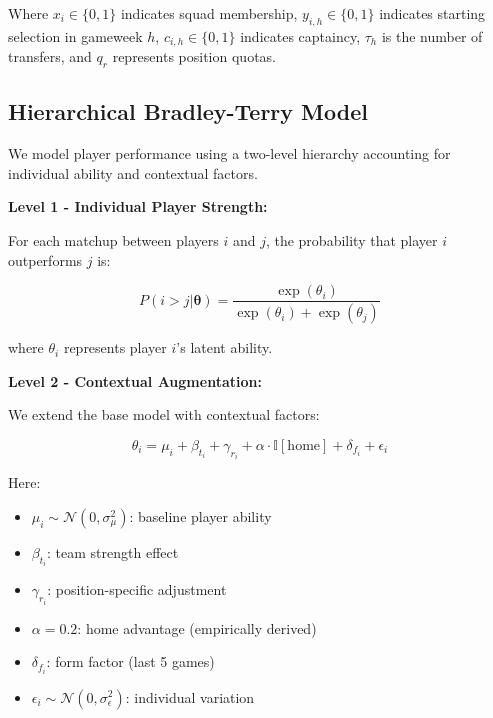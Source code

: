 \documentclass[10pt,a4paper,twocolumn]{article}
\begin{document}
Where $x_i \in \{0,1\}$ indicates squad membership, $y_{i,h} \in \{0,1\}$ indicates starting selection in gameweek $h$, $c_{i,h} \in \{0,1\}$ indicates captaincy, $\tau_h$ is the number of transfers, and $q_r$ represents position quotas.

\subsection*{Hierarchical Bradley-Terry Model}

We model player performance using a two-level hierarchy accounting for individual ability and contextual factors.

\textbf{Level 1 - Individual Player Strength:}

For each matchup between players $i$ and $j$, the probability that player $i$ outperforms $j$ is:

\begin{equation}
P(i > j | \boldsymbol{\theta}) = \frac{\exp(\theta_i)}{\exp(\theta_i) + \exp(\theta_j)}
\end{equation}

where $\theta_i$ represents player $i$'s latent ability.

\textbf{Level 2 - Contextual Augmentation:}

We extend the base model with contextual factors:

\begin{equation}
\theta_i = \mu_i + \beta_{t_i} + \gamma_{r_i} + \alpha \cdot \mathbb{I}[\text{home}] + \delta_{f_i} + \epsilon_i
\end{equation}

Here:
\begin{itemize}
\item $\mu_i \sim \mathcal{N}(0, \sigma^2_\mu)$: baseline player ability
\item $\beta_{t_i}$: team strength effect
\item $\gamma_{r_i}$: position-specific adjustment
\item $\alpha = 0.2$: home advantage (empirically derived)
\item $\delta_{f_i}$: form factor (last 5 games)
\item $\epsilon_i \sim \mathcal{N}(0, \sigma^2_\epsilon)$: individual variation
\end{itemize}
\end{document}
